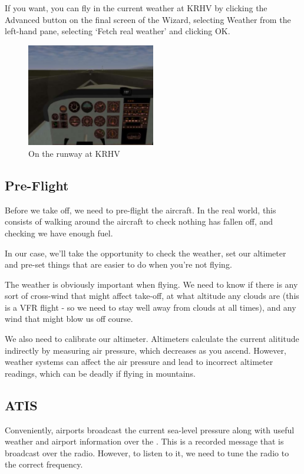 If you want, you can fly in the current weather at KRHV by clicking the Advanced button on the final screen of the Wizard, selecting Weather from the left-hand pane, selecting `Fetch real weather' and clicking OK. 

\begin{figure}[!htp]
\centering
\includegraphics[width=0.5\textwidth]{krhvrunway}
\caption{On the runway at KRHV}
\end{figure}

\subsection{Pre-Flight}

Before we take off, we need to pre-flight the aircraft. In the real world, this consists of walking around the aircraft to check nothing has fallen off, and checking we have enough fuel.

In our case, we'll take the opportunity to check the weather, set our altimeter and pre-set things that are easier to do when you're not flying.

The weather is obviously important when flying. We need to know if there is any sort of cross-wind that might affect take-off, at what altitude any clouds are (this is a VFR flight - so we need to stay well away from clouds at all times), and any wind that might blow us off course.

We also need to calibrate our altimeter. Altimeters calculate the current alititude indirectly by measuring air pressure, which decreases as you ascend. However, weather systems can affect the air pressure and lead to incorrect altimeter readings, which can be deadly if flying in mountains. 

\subsection{ATIS}

Conveniently, airports broadcast the current sea-level pressure along with useful weather and airport information over the . This is a recorded message that is broadcast over the radio. However, to listen to it, we need to tune the radio to the correct frequency.

